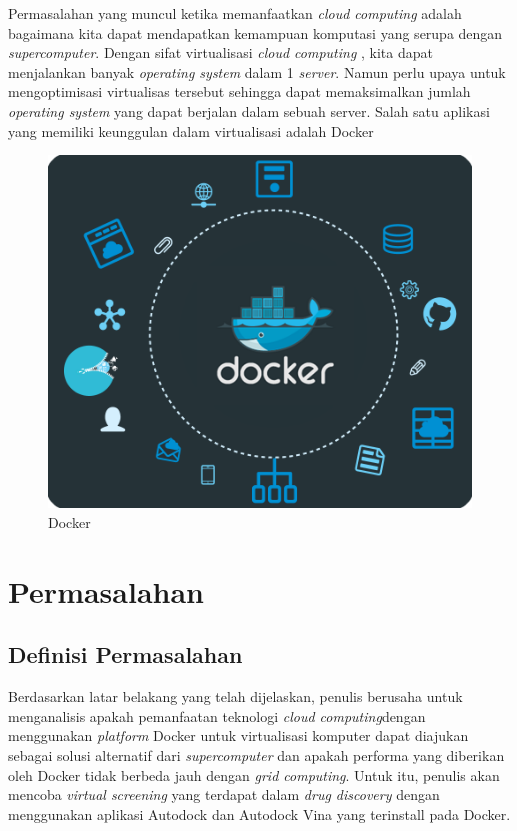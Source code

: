 Permasalahan yang muncul ketika memanfaatkan \textit{cloud computing} adalah bagaimana kita dapat mendapatkan kemampuan komputasi yang serupa dengan \textit{supercomputer}. Dengan sifat virtualisasi \textit{cloud computing} , kita dapat menjalankan banyak \textit{operating system} dalam 1 \textit{server}. Namun perlu upaya untuk mengoptimisasi virtualisas tersebut sehingga dapat memaksimalkan jumlah \textit{operating system } yang dapat berjalan dalam sebuah server. Salah satu aplikasi yang memiliki keunggulan dalam virtualisasi adalah Docker
\begin{figure}
	\centering
	\includegraphics{docker.png}
	\caption{Docker}
\end{figure}

 

\section{Permasalahan}
\subsection{Definisi Permasalahan}
\hspace{0.5cm}Berdasarkan latar belakang yang telah dijelaskan, penulis berusaha untuk menganalisis apakah pemanfaatan teknologi \textit{cloud computing}dengan menggunakan \textit{platform} Docker untuk virtualisasi komputer dapat diajukan sebagai solusi alternatif dari \textit{supercomputer} dan apakah performa yang diberikan oleh Docker tidak berbeda jauh dengan \textit{grid computing}. Untuk itu, penulis akan mencoba \textit{virtual screening} yang terdapat dalam \textit{drug discovery} dengan menggunakan aplikasi Autodock dan Autodock Vina yang terinstall pada Docker.

